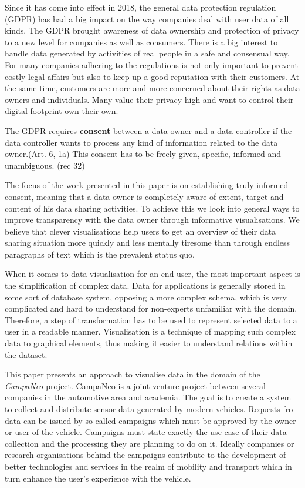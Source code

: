 
  Since it has come into effect in 2018, the general data protection regulation (GDPR) has had a big impact on the way companies deal with user data of all kinds.
  The GDPR brought awareness of data ownership and protection of privacy to a new level for companies as well as consumers.
  There is a big interest to handle data generated by activities of real people in a safe and consensual way. For many companies adhering to the regulations is not only important to prevent costly legal affairs but also to keep up a good reputation with their customers.
  At the same time, customers are more and more concerned about their rights as data owners and individuals. Many value their privacy high and want to control their digital footprint own their own.
  
  The GDPR requires \textbf{consent} between a data owner and a data controller if the data controller wants to process any kind of information related to the data owner.(Art. 6, 1a) This consent has to be freely given, specific, informed and unambiguous. (rec 32)
  
  The focus of the work presented in this paper is on establishing truly informed consent, meaning that a data owner is completely aware of extent, target and content of his data sharing activities. 
  To achieve this we look into general ways to improve transparency with the data owner through informative visualisations. We believe that clever visualisations help users to get an overview of their data sharing situation more quickly and less mentally tiresome than through endless paragraphs of text which is the prevalent status quo.
  
  When it comes to data visualisation for an end-user, the most important aspect is the simplification of complex data. Data for applications is generally stored in some sort of database system, opposing a more complex schema, which is very complicated and hard to understand for non-experts unfamiliar with the domain. Therefore, a step of transformation has to be used to represent selected data to a user in a readable manner. Visualisation is a technique of mapping such complex data to graphical elements, thus making it easier to understand relations within the dataset.

  This paper presents an approach to visualise data in the domain of the \textit{CampaNeo} project. CampaNeo is a joint venture project between several companies in the automotive area and academia. The goal is to create a system to collect and distribute sensor data generated by modern vehicles.
  Requests fro data can be issued by so called campaigns which must be approved by the owner or user of the vehicle. Campaigns must state exactly the use-case of their data collection and the processing they are planning to do on it. Ideally companies or research organisations behind the campaigns contribute to the development of better technologies and services in the realm of mobility and transport which in turn enhance the user's experience with the vehicle.
  
